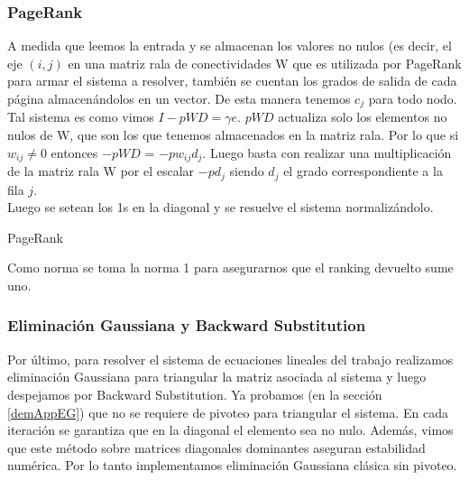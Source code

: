 \subsubsection{PageRank}

A medida que leemos la entrada y se almacenan los valores no nulos (es decir, el eje $(i,j)$ en una matriz rala de conectividades W que es utilizada por PageRank para armar el sistema a resolver, también se cuentan los grados de salida de cada página almacenándolos en un vector. De esta manera tenemos $c_{j}$ para todo nodo. \\

Tal sistema es como vimos $ I - pWD = \gamma e $. $pWD$ actualiza solo los elementos no nulos de W, que son los que tenemos almacenados en la matriz rala. Por lo que si $w_{ij} \neq 0$ entonces $-pWD$ = $-pw_{ij}d_{j}$.  Luego basta con realizar una multiplicación de la matriz rala W por el escalar $-pd_{j}$ siendo $d_{j}$ el grado correspondiente a la fila $j$. \\

Luego se setean los 1s en la diagonal y se resuelve el sistema normalizándolo.  \\

\begin{algorithm}[H]
\caption{PageRank}
\begin{algorithmic}[3]
    \EndFor	
\EndProcedure 

\end{algorithmic}
\end{algorithm} 

Como norma se toma la norma 1 para asegurarnos que el ranking devuelto sume uno. \\


\subsubsection{Eliminación Gaussiana y Backward Substitution}

Por último, para resolver el sistema de ecuaciones lineales del trabajo realizamos eliminación Gaussiana para triangular la matriz asociada al sistema y luego despejamos por Backward Substitution. Ya probamos (en la sección \ref{demAppEG}) que no se requiere de pivoteo para triangular el sistema. En cada iteración se garantiza que en la diagonal el elemento sea no nulo. Además, vimos que este método sobre matrices diagonales dominantes aseguran estabilidad numérica. Por lo tanto implementamos eliminación Gaussiana clásica sin pivoteo.\\

